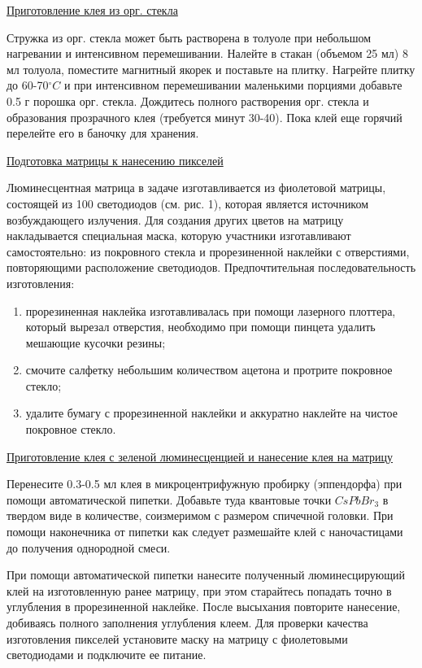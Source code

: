 \underline{Приготовление клея из орг. стекла}

Стружка из орг. стекла может быть растворена в толуоле при небольшом нагревании и интенсивном перемешивании. Налейте в стакан (объемом 25 мл) 8 мл толуола, поместите магнитный якорек и поставьте на плитку. Нагрейте плитку до 60-70$^\circ C$ и при интенсивном перемешивании маленькими порциями добавьте 0.5 г порошка орг. стекла. Дождитесь полного растворения орг. стекла и образования прозрачного клея (требуется минут 30-40). Пока клей еще горячий перелейте его в баночку для хранения.

\underline{Подготовка матрицы к нанесению пикселей}

Люминесцентная матрица в задаче изготавливается из фиолетовой матрицы, состоящей из 100 светодиодов (см. рис. 1), которая является источником возбуждающего излучения. Для создания других цветов на матрицу накладывается специальная маска, которую участники изготавливают самостоятельно: из покровного стекла и прорезиненной наклейки с отверстиями, повторяющими расположение светодиодов. Предпочтительная последовательность изготовления:

\begin{enumerate}
    \item прорезиненная наклейка изготавливалась при помощи лазерного плоттера, который вырезал отверстия, необходимо при помощи пинцета удалить мешающие кусочки резины;
    \item смочите салфетку небольшим количеством ацетона и протрите покровное стекло;
    \item удалите бумагу с прорезиненной наклейки и аккуратно наклейте на чистое покровное стекло.
\end{enumerate}

\underline{Приготовление клея с зеленой люминесценцией и нанесение клея на матрицу}

Перенесите 0.3-0.5 мл клея в микроцентрифужную пробирку (эппендорфа) при помощи автоматической пипетки. Добавьте туда квантовые точки $CsPbBr_3$ в твердом виде в количестве, соизмеримом с размером спичечной головки. При помощи наконечника от пипетки как следует размешайте клей с наночастицами до получения однородной смеси.

При помощи автоматической пипетки нанесите полученный люминесцирующий клей на изготовленную ранее матрицу, при этом старайтесь попадать точно в углубления в прорезиненной наклейке. После высыхания повторите нанесение, добиваясь полного заполнения углубления клеем. Для проверки качества изготовления пикселей установите маску на матрицу с фиолетовыми светодиодами и подключите ее питание.

